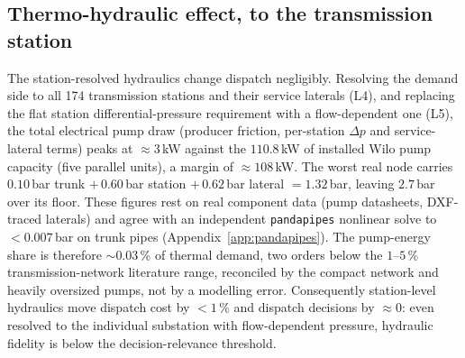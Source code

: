 \documentclass[a4paper,fleqn]{cas-sc}
\begin{document}
\subsection{Thermo-hydraulic effect, to the transmission station}\label{subsec:hydraulics}
The station-resolved hydraulics change dispatch negligibly. Resolving the demand side
to all 174 transmission stations and their service laterals (L4), and replacing the
flat station differential-pressure requirement with a flow-dependent one (L5), the
total electrical pump draw (producer friction, per-station $\Delta p$ and
service-lateral terms) peaks at $\approx 3$\,kW against the $110.8$\,kW of installed
Wilo pump capacity (five parallel units), a margin of $\approx 108$\,kW. The worst
real node carries $0.10$\,bar trunk $+\,0.60$\,bar station $+\,0.62$\,bar lateral
$=1.32$\,bar, leaving $2.7$\,bar over its floor. These figures rest on real component
data (pump datasheets, DXF-traced laterals) and agree with an independent
\texttt{pandapipes} nonlinear solve to $<0.007$\,bar on trunk pipes
(Appendix~\ref{app:pandapipes}). The pump-energy share is therefore $\sim\!0.03$\,\%
of thermal demand, two orders below the $1$--$5$\,\% transmission-network literature
range, reconciled by the compact network and heavily oversized pumps, not by a
modelling error. Consequently station-level hydraulics move dispatch cost by $<1$\,\%
and dispatch decisions by $\approx 0$: even resolved to the individual substation with
flow-dependent pressure, hydraulic fidelity is below the decision-relevance threshold.
\end{document}
